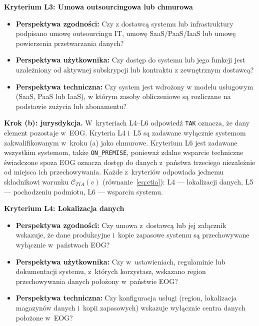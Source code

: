 
\textbf{Kryterium L3: Umowa outsourcingowa lub chmurowa}

\begin{itemize}
\item \textbf{Perspektywa zgodności:} Czy z dostawcą systemu lub infrastruktury podpisano umowę outsourcingu IT, umowę SaaS/PaaS/IaaS lub umowę powierzenia przetwarzania danych?
\item \textbf{Perspektywa użytkownika:} Czy dostęp do systemu lub jego funkcji jest uzależniony od aktywnej subskrypcji lub kontraktu z zewnętrznym dostawcą?
\item \textbf{Perspektywa techniczna:} Czy system jest wdrożony w modelu usługowym (SaaS, PaaS lub IaaS), w którym zasoby obliczeniowe są rozliczane na podstawie zużycia lub abonamentu?
\end{itemize}


\bigskip

\noindent\textbf{Krok (b): jurysdykcja.} W~kryteriach L4--L6 odpowiedź \texttt{TAK} oznacza, że dany element pozostaje w~EOG. Kryteria L4 i~L5 są zadawane wyłącznie systemom zakwalifikowanym w~kroku (a) jako chmurowe. Kryterium L6 jest zadawane wszystkim systemom, także \texttt{ON\_PREMISE}, ponieważ zdalne wsparcie techniczne świadczone spoza EOG oznacza dostęp do danych z~państwa trzeciego niezależnie od miejsca ich przechowywania. Każde z~kryteriów odpowiada jednemu składnikowi warunku $\mathcal{C}_{TIA}(v)$ (równanie~\eqref{eq:ctia}): L4 --- lokalizacji danych, L5 --- pochodzeniu podmiotu, L6 --- wsparciu systemu.

\bigskip

\textbf{Kryterium L4: Lokalizacja danych}

\begin{itemize}
\item \textbf{Perspektywa zgodności:} Czy umowa z~dostawcą lub jej załącznik wskazuje, że dane produkcyjne i~kopie zapasowe systemu są przechowywane wyłącznie w~państwach EOG?
\item \textbf{Perspektywa użytkownika:} Czy w~ustawieniach, regulaminie lub dokumentacji systemu, z~których korzystasz, wskazano region przechowywania danych położony w~państwie EOG?
\item \textbf{Perspektywa techniczna:} Czy konfiguracja usługi (region, lokalizacja magazynów danych i~kopii zapasowych) wskazuje wyłącznie centra danych położone w~EOG?
\end{itemize}

